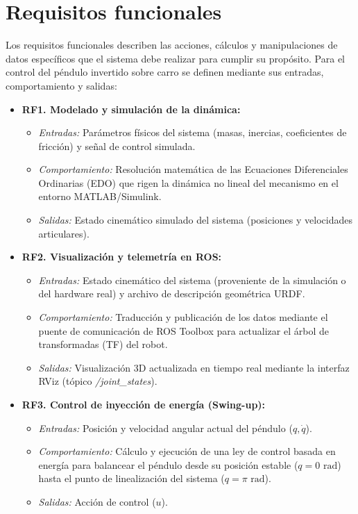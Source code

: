 \documentclass[11pt,fleqn]{book} %
\begin{document}
\section{Requisitos funcionales}
Los requisitos funcionales describen las acciones, cálculos y manipulaciones de datos específicos que el sistema debe realizar para cumplir su propósito. Para el control del péndulo invertido sobre carro se definen mediante sus entradas, comportamiento y salidas:

\begin{itemize}
	\item \textbf{RF1. Modelado y simulación de la dinámica:} 
	\begin{itemize}
		\item \textit{Entradas:} Parámetros físicos del sistema (masas, inercias, coeficientes de fricción) y señal de control simulada.
		\item \textit{Comportamiento:} Resolución matemática de las Ecuaciones Diferenciales Ordinarias (EDO) que rigen la dinámica no lineal del mecanismo en el entorno MATLAB/Simulink.
		\item \textit{Salidas:} Estado cinemático simulado del sistema (posiciones y velocidades articulares).
	\end{itemize}
	
	\item \textbf{RF2. Visualización y telemetría en ROS:}
	\begin{itemize}
		\item \textit{Entradas:} Estado cinemático del sistema (proveniente de la simulación o del hardware real) y archivo de descripción geométrica URDF.
		\item \textit{Comportamiento:} Traducción y publicación de los datos mediante el puente de comunicación de ROS Toolbox para actualizar el árbol de transformadas (TF) del robot.
		\item \textit{Salidas:} Visualización 3D actualizada en tiempo real mediante la interfaz RViz (tópico \textit{/joint\_states}).
	\end{itemize}
	
	\item \textbf{RF3. Control de inyección de energía (Swing-up):} 
	\begin{itemize}
		\item \textit{Entradas:} Posición y velocidad angular actual del péndulo ($q, \dot{q}$).
		\item \textit{Comportamiento:} Cálculo y ejecución de una ley de control basada en energía para balancear el péndulo desde su posición estable ($q = 0 \text{ rad}$) hasta el punto de linealización del sistema ($q = \pi \text{ rad}$).
		\item \textit{Salidas:} Acción de control ($u$).
	\end{itemize}
	

\end{itemize}
\end{document}
